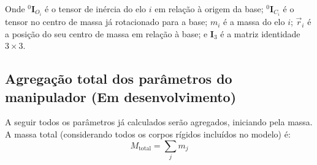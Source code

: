 Onde ${}^{0}\mathbf{I}_{O_i}$ é o tensor de inércia do elo $i$ em relação à origem da base;
${}^{0}\mathbf{I}_{C_i}$ é o tensor no centro de massa já rotacionado para a base;
$m_i$ é a massa do elo $i$;
$\vec r_i$ é a posição do seu centro de massa em relação à base;
e $\mathbf{I}_3$ é a matriz identidade $3\times 3$.








\subsection{Agregação total dos parâmetros do manipulador (Em desenvolvimento)}
A seguir todos os parâmetros já calculados serão agregados, iniciando pela massa. A massa total (considerando todos os corpos rígidos incluídos no modelo) é:
\begin{equation}
  M_{\text{total}} = \sum_{j} m_j
\end{equation}

